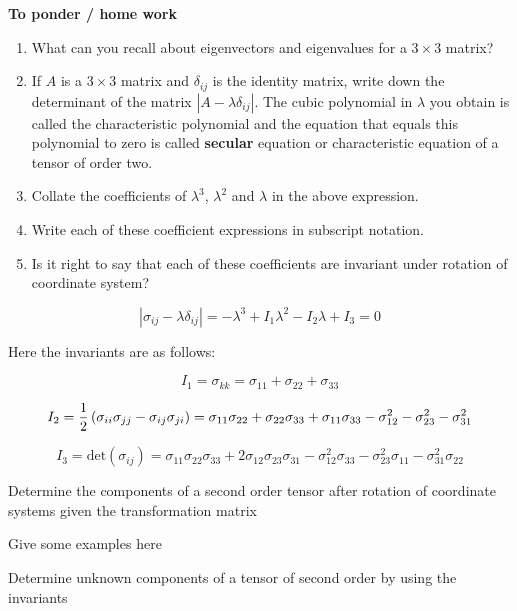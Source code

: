 {\bf To ponder / home work}

\begin{enumerate}
\item What can you recall about eigenvectors and eigenvalues for a $3 \times 3$ matrix?
\item If $A$ is a $3 \times 3$ matrix and $\delta_{ij}$ is the identity matrix, write down the determinant of the matrix $\left| A - \lambda \delta_{ij} \right|$. The cubic polynomial in $\lambda$ you obtain is called the characteristic polynomial and the equation that equals this polynomial to zero is called {\bf secular} equation or characteristic equation of a tensor of order two.
\item Collate the coefficients of $\lambda^3$, $\lambda^2$ and $\lambda$ in the above expression.
\item Write each of these coefficient expressions in subscript notation.
\item Is it right to say that each of these coefficients are invariant under rotation of coordinate system?
\end{enumerate}

\begin{equation}
\left| \sigma_{ij} - \lambda \delta_{ij} \right| = - \lambda^3 + I_1 \lambda^2 - I_2 \lambda + I_3 = 0
\end{equation}

Here the invariants are as follows:

$$ I_1 = \sigma_{kk} = \sigma_{11} + \sigma_{22} + \sigma_{33} $$

$$ I_2 = {1 \over 2} \left( \sigma_{ii} \sigma_{jj} - \sigma_{ij} \sigma_{ji} \right) = \sigma_{11} \sigma_{22} + \sigma_{22} \sigma_{33} + \sigma_{11} \sigma_{33} - \sigma_{12}^2 - \sigma_{23}^2 - \sigma_{31}^2 $$

$$ I_3 = \text{det}(\sigma_{ij}) = \sigma_{11} \sigma_{22} \sigma_{33} + 2 \sigma_{12} \sigma_{23} \sigma_{31} - \sigma_{12}^2 \sigma_{33} - \sigma_{23}^2 \sigma_{11} - \sigma_{31}^2 \sigma_{22} $$


\begin{lo2}
\item Determine the components of a second order tensor after rotation of coordinate systems given the transformation matrix
\end{lo2}

Give some examples here

\begin{lo2}
\item Determine unknown components of a tensor of second order by using the invariants
\end{lo2}


